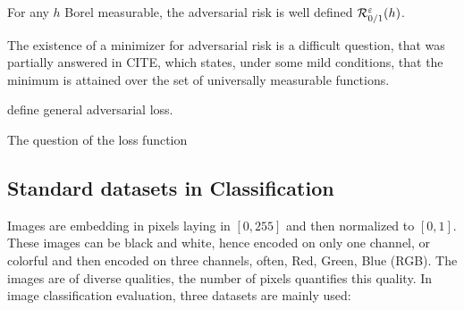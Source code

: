 \begin{prop}
For any $h$ Borel measurable, the adversarial risk is well defined $\mathcal{R}^\varepsilon_{0/1}(h)$.
\end{prop}

The existence of a minimizer for adversarial risk is a difficult question, that was partially answered in CITE, which states, under some mild conditions, that the minimum is attained over the set of universally measurable functions.


 define general adversarial loss.



The question of the loss function 


\subsection{Standard datasets in Classification}
Images are embedding in pixels laying in $[0,255]$ and then normalized to $[0,1]$. These images can be black and white, hence encoded on only one channel, or colorful and then encoded on three channels, often, Red, Green, Blue (RGB). The images are of diverse qualities, the number of pixels quantifies this quality.  In image classification evaluation, three datasets are mainly used:
